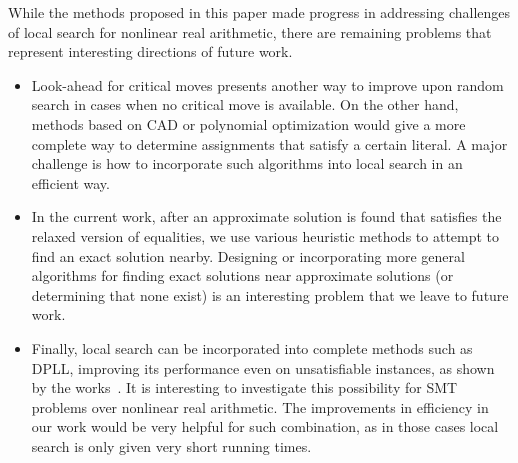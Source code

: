 \documentclass[runningheads]{llncs}
\begin{document}
While the methods proposed in this paper made progress in addressing challenges of local search for nonlinear real arithmetic, there are remaining problems that represent interesting directions of future work.
\begin{itemize}
    \item Look-ahead for critical moves presents another way to improve upon random search in cases when no critical move is available. On the other hand, methods based on CAD or polynomial optimization would give a more complete way to determine assignments that satisfy a certain literal. A major challenge is how to incorporate such algorithms into local search in an efficient way.

    \item In the current work, after an approximate solution is found that satisfies the relaxed version of equalities, we use various heuristic methods to attempt to find an exact solution nearby. Designing or incorporating more general algorithms for finding exact solutions near approximate solutions (or determining that none exist) is an interesting problem that we leave to future work.

    \item Finally, local search can be incorporated into complete methods such as DPLL, improving its performance even on unsatisfiable instances, as shown by the works~\cite{CaiZ21,CaiZFB22}. It is interesting to investigate this possibility for SMT problems over nonlinear real arithmetic. The improvements in efficiency in our work would be very helpful for such combination, as in those cases local search is only given very short running times. 
\end{itemize}



\end{document}

